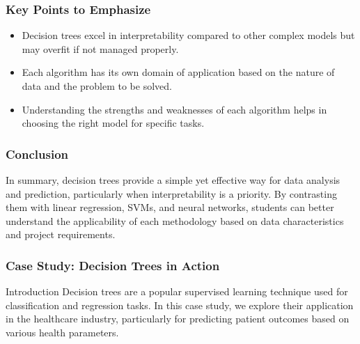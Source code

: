 \documentclass[aspectratio=169]{beamer}
\begin{document}
\begin{frame}[fragile]
    \frametitle{Key Points to Emphasize}
    \begin{itemize}
        \item Decision trees excel in interpretability compared to other complex models but may overfit if not managed properly.
        \item Each algorithm has its own domain of application based on the nature of data and the problem to be solved.
        \item Understanding the strengths and weaknesses of each algorithm helps in choosing the right model for specific tasks.
    \end{itemize}
\end{frame}

\begin{frame}[fragile]
    \frametitle{Conclusion}
    In summary, decision trees provide a simple yet effective way for data analysis and prediction, particularly when interpretability is a priority. By contrasting them with linear regression, SVMs, and neural networks, students can better understand the applicability of each methodology based on data characteristics and project requirements.
\end{frame}

\begin{frame}
    \frametitle{Case Study: Decision Trees in Action}
    \begin{block}{Introduction}
        Decision trees are a popular supervised learning technique used for classification and regression tasks. 
        In this case study, we explore their application in the healthcare industry, particularly for predicting patient outcomes based on various health parameters.
    \end{block}
\end{frame}
\end{document}
